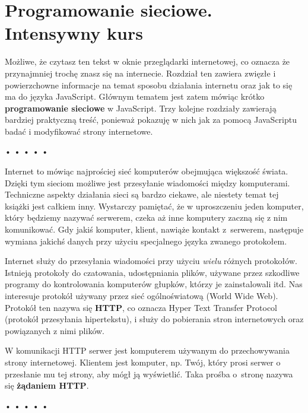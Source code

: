 \chapter{ Programowanie sieciowe. Intensywny kurs}
\label{chap:11}

  
Możliwe, że czytasz ten tekst w oknie przeglądarki internetowej, co oznacza że przynajmniej trochę znasz się na internecie. Rozdział ten zawiera zwięzłe i powierzchowne informacje na temat sposobu działania internetu oraz jak to się ma do języka JavaScript. Głównym tematem jest zatem mówiąc krótko \textbf{programowanie sieciowe} w JavaScript. Trzy kolejne rozdziały zawierają bardziej praktyczną treść, ponieważ pokazuję w nich jak za pomocą JavaScriptu badać i modyfikować strony internetowe.


\begin{center}
• • • • •
\end{center}

  
Internet to mówiąc najprościej sieć komputerów obejmująca większość świata. Dzięki tym sieciom możliwe jest przesyłanie wiadomości między komputerami. Techniczne aspekty działania sieci są bardzo ciekawe, ale niestety temat tej książki jest całkiem inny. Wystarczy pamiętać, że w uproszczeniu jeden komputer, który będziemy nazywać serwerem, czeka aż inne komputery zaczną się z nim komunikować. Gdy jakiś komputer, klient, nawiąże kontakt z~serwerem, następuje wymiana jakichś danych przy użyciu specjalnego języka zwanego protokołem.

  
Internet służy do przesyłania wiadomości przy użyciu \emph{wielu} różnych protokołów. Istnieją protokoły do czatowania, udostępniania plików, używane przez szkodliwe programy do kontrolowania komputerów głupków, którzy je zainstalowali itd. Nas interesuje protokół używany przez sieć ogólnoświatową (World Wide Web). Protokół ten nazywa się \textbf{HTTP}, co oznacza Hyper Text Transfer Protocol (protokół przesyłania hipertekstu), i służy do pobierania stron internetowych oraz powiązanych z nimi plików.

  
W komunikacji HTTP serwer jest komputerem używanym do przechowywania strony internetowej. Klientem jest komputer, np. Twój, który prosi serwer o przesłanie mu tej strony, aby mógł ją wyświetlić. Taka prośba o~stronę nazywa się \textbf{żądaniem HTTP}.



\begin{center}
• • • • •
\end{center}

